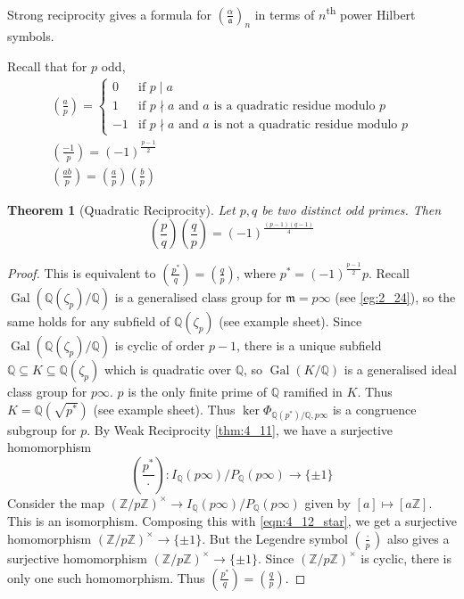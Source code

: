 \documentclass[11pt]{article}
\theoremstyle{definition}
\theoremstyle{plain}
\newtheorem{theorem}[definition]{Theorem}
\theoremstyle{remark}
\DeclareMathOperator{\Gal}{Gal}
\newcommand{\ZZ}{\mathbb{Z}}
\newcommand{\QQ}{\mathbb{Q}}
\newcommand{\fa}{\mathfrak{a}}
\newcommand{\fm}{\mathfrak{m}}
\newcommand{\leg}[2]{\left(\frac{#1}{#2}\right)}
\begin{document}
\noindent Strong reciprocity gives a formula for $\leg{\alpha}{\fa}_n$ in terms of $n$\textsuperscript{th} power Hilbert symbols.

\noindent Recall that for $p$ odd,
\begin{gather*}
    \leg{a}{p} =
    \begin{cases}
        0 & \text{if } p \mid a\\
        1 & \text{if } p \nmid a \text{ and } a \text{ is a quadratic residue modulo } p\\
        -1 & \text{if } p \nmid a \text{ and } a \text{ is not a quadratic residue modulo } p
    \end{cases}\\
    \leg{-1}{p} = (-1)^{\frac{p-1}{2}}\\
    \leg{ab}{p} = \leg{a}{p} \leg{b}{p}
\end{gather*}

\begin{theorem}[Quadratic Reciprocity]\label{thm:4_12}
    Let $p, q$ be two distinct odd primes. Then
    \begin{equation*}
        \leg{p}{q} \leg{q}{p} = (-1)^{\frac{(p-1)(q-1)}{4}}
    \end{equation*}
\end{theorem}
\begin{proof}
    This is equivalent to $\leg{p^*}{q} = \leg{q}{p}$, where $p^* = (-1)^{\frac{p-1}{2}} p$. Recall $\Gal(\QQ(\zeta_p)/\QQ)$ is a generalised class group for $\fm = p \infty$ (see \autoref{eg:2_24}), so the same holds for any subfield of $\QQ(\zeta_p)$ (see example sheet). Since $\Gal(\QQ(\zeta_p)/\QQ)$ is cyclic of order $p-1$, there is a unique subfield $\QQ \subseteq K \subseteq \QQ(\zeta_p)$ which is quadratic over $\QQ$, so $\Gal(K/\QQ)$ is a generalised ideal class group for $p \infty$. $p$ is the only finite prime of $\QQ$ ramified in $K$. Thus $K = \QQ(\sqrt{p^*})$ (see example sheet). Thus $\ker \Phi_{\QQ(p^*)/\QQ, p \infty}$ is a congruence subgroup for $p$. By Weak Reciprocity \autoref{thm:4_11}, %
    we have a surjective homomorphism
    \begin{equation}\label{eqn:4_12_star}
        \leg{p^*}{\cdot} : I_\QQ(p \infty) / P_\QQ(p \infty) \to \{\pm 1\}
    \end{equation}
    Consider the map $(\ZZ / p \ZZ)^\times \to I_\QQ(p\infty)/P_\QQ(p\infty)$ given by $[a] \mapsto [a \ZZ]$. This is an isomorphism. Composing this with \eqref{eqn:4_12_star}, we get a surjective homomorphism $(\ZZ/p\ZZ)^\times \to \{\pm 1\}$. But the Legendre symbol $\leg{\cdot}{p}$ also gives a surjective homomorphism $(\ZZ/p\ZZ)^\times \to \{\pm 1\}$. Since $(\ZZ/p\ZZ)^\times$ is cyclic, there is only one such homomorphism. Thus $\leg{p^*}{q} = \leg{q}{p}$.
\end{proof}
\end{document}
